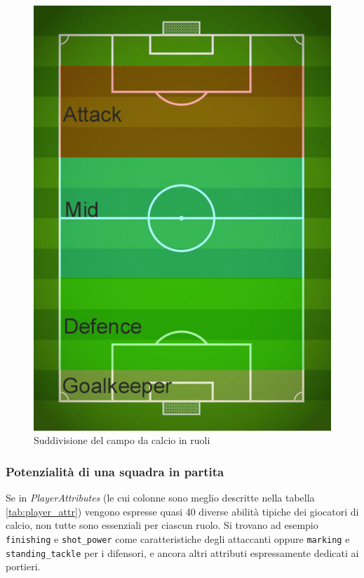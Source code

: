 \documentclass[hidelinks, 12pt]{article}
\begin{document}
\begin{figure}[H]
	\centering
	\includegraphics[scale=0.4]{images/soccer-field-horizontal.png}
	\caption[Suddivisione del campo da calcio in ruoli]{Suddivisione del campo da calcio in ruoli}
	\label{fig:soccer-field}
\end{figure}


\subsubsection{Potenzialità di una squadra in partita}

Se in \textit{PlayerAttributes} (le cui colonne sono meglio descritte nella tabella \ref{tab:player_attr}) vengono espresse quasi 40 diverse abilità tipiche dei giocatori di calcio, non tutte sono essenziali per ciascun ruolo. Si trovano ad esempio \texttt{finishing} e \texttt{shot\_power} come caratteristiche degli attaccanti oppure \texttt{marking} e \texttt{standing\_tackle} per i difensori, e ancora altri attributi espressamente dedicati ai portieri.
\end{document}
